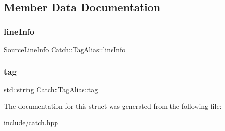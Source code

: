 \subsection{Member Data Documentation}
\mbox{\label{struct_catch_1_1_tag_alias_a2f51fe0b3c052561275d26b6eb88f702}} 
\subsubsection{\texorpdfstring{line\+Info}{lineInfo}}
{\footnotesize\ttfamily \mbox{\hyperlink{struct_catch_1_1_source_line_info}{Source\+Line\+Info}} Catch\+::\+Tag\+Alias\+::line\+Info}

\mbox{\label{struct_catch_1_1_tag_alias_a950183883ab17c90d0fab16b966b6e2d}} 
\subsubsection{\texorpdfstring{tag}{tag}}
{\footnotesize\ttfamily std\+::string Catch\+::\+Tag\+Alias\+::tag}



The documentation for this struct was generated from the following file\+:\begin{DoxyCompactItemize}
\item 
include/\mbox{\hyperlink{catch_8hpp}{catch.\+hpp}}\end{DoxyCompactItemize}
